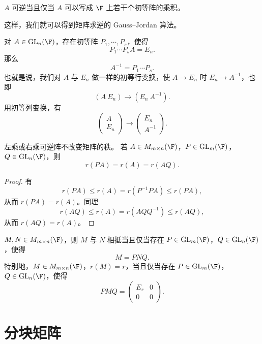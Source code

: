 \begin{corollary}\label{3.4.10}
	$A$ 可逆当且仅当 $A$ 可以写成 $\F$ 上若干个初等阵的乘积。
\end{corollary}

这样，我们就可以得到矩阵求逆的 Gauss--Jordan 算法。

\begin{algo}
	对 $A\in\operatorname{GL}_n(\F)$，存在初等阵 $P_1,\cdots,P_s$，使得
	\[
	P_1\cdots P_sA=E_n.
	\]
	那么
	\[
	A^{-1}=P_1\cdots P_s.
	\]
	也就是说，我们对 $A$ 与 $E_n$ 做一样的初等行变换，使 $A\to E_n$ 时 $E_n\to A^{-1}$，也即
	\[
	(A\ E_n)\longrightarrow (E_n\ A^{-1}).
	\]
	用初等列变换，有
	\[
	\left(\begin{array}{c}
		A\\ 
		E_n
	\end{array}\right)
	\longrightarrow
	\left(\begin{array}{c}
		E_n\\ 
		A^{-1}
	\end{array}\right).
	\]
\end{algo}


\begin{corollary}\label{3.4.12}
	左乘或右乘可逆阵不改变矩阵的秩。
	若 $A\in M_{m\times n}(\F)$，$P\in\operatorname{GL}_m(\F)$，$Q\in\operatorname{GL}_n(\F)$，则
	\[
	r(PA)=r(A)=r(AQ).
	\]
\end{corollary}

\begin{proof}
	有
	\[
	r(PA)\leq r(A)=r(P^{-1}PA)\leq r(PA),
	\]
	从而 $r(PA)=r(A)$。同理
	\[
	r(AQ)\leq r(A)=r(AQQ^{-1})\leq r(AQ),
	\]
	从而 $r(AQ)=r(A)$。
\end{proof}

\begin{corollary}\label{3.4.13}
	$M,N\in M_{m\times n}(\F)$，则 $M$ 与 $N$ 相抵当且仅当存在
	$P\in\operatorname{GL}_m(\F)$，$Q\in\operatorname{GL}_n(\F)$，使得
	\[
	M=PNQ.
	\]
	特别地，$M\in M_{m\times n}(\F)$，$r(M)=r$，当且仅当存在
	$P\in\operatorname{GL}_m(\F)$，$Q\in\operatorname{GL}_n(\F)$，使得
	\[
	PMQ=\begin{pmatrix}
		E_r&0\\
		0&0
	\end{pmatrix}.
	\]
\end{corollary}



\section{分块矩阵}

